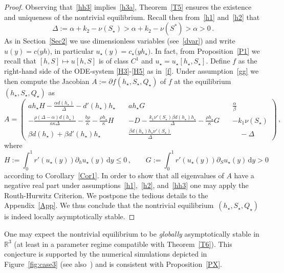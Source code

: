 \documentclass[reqno,11pt]{amsart}
\numberwithin{equation}{section}
\newcommand{\rd}{\mathrm{d}}
\begin{document}
\begin{proof}
Observing that~\eqref{hh3} implies~\eqref{h3a}, Theorem~\ref{T5} ensures the existence and uniqueness of the nontrivial equilibrium.
Recall then from~\eqref{h1} and~\eqref{h2} that
\begin{equation}\label{Delta}
\Delta:=\alpha+k_2-\nu(S_\star)>\alpha+k_2-\nu(S^*)>\alpha>0\,. 
\end{equation}
As in Section~\ref{Sec2} we use dimensionless variables (see~\eqref{dvar}) and write
$u(y)=c\bigl(yh\bigr)$, in particular $u_\star(y)=c_\star\bigl(yh_\star\bigr)$. In fact, from Proposition~\ref{P1} we recall that $[h,S]\mapsto u[h,S]$ is of class $C^1$ and $u_\star=u_\star[h_\star,S_\star]$.
Define $f$ as the right-hand side of the ODE-system \eqref{H3}-\eqref{H5} as in~\eqref{f}.
Under assumption~\eqref{gg} we then compute the Jacobian $A:=\partial f(h_\star,S_\star,Q_\star)$ of $f$  at the equilibrium $(h_\star,S_\star,Q_\star)$ as
\begin{equation}\label{MA}
A=
\left(\begin{matrix}
a   h_\star   H -\frac{\alpha  d(h_\star)}{\Delta}-d'(h_\star)  h_\star\quad  & a   h_\star   G\quad & \frac{\alpha}{\beta}\\[4pt]
-\frac{\rho (\Delta-\alpha)d(h_\star)}{a   \kappa    \Delta}-\frac{b   \rho}{\kappa}-\frac{\rho  h_\star}{\kappa}  H \quad &-D-\frac{k_1   \nu'(S_\star)  \beta  d(h_\star)   h_\star}{\Delta}-\frac{\rho  h_\star}{\kappa}  G\quad  & -k_1   \nu(S_\star)\\[4pt]
\beta  d(h_\star) +\beta  d'(h_\star)  h_\star\quad &\frac{\beta  d(h_\star)   h_\star   \nu'(S_\star)}{\Delta}&\quad -\Delta
\end{matrix}\right)\,,
\end{equation}
where
\begin{equation}\label{GH}
H:=\int_0^1 r'(u_\star(y))\partial_h u_\star(y)\,\rd y\le 0\,,\qquad G:=\int_0^1 r'(u_\star(y))\partial_S u_\star(y)\,\rd y> 0
\end{equation}
according to Corollary~\ref{Cor1}.  In order to show that all eigenvalues of $A$ have a negative real part under assumptions~\eqref{h1},~\eqref{h2}, and~\eqref{hh3} one may apply the Routh-Hurwitz Criterion. We postpone the tedious details to the Appendix~\ref{App}. 
We thus conclude that the nontrivial equilibrium~$(h_\star,S_\star,Q_\star)$ is indeed locally asymptotically  stable. 
\end{proof}

One may expect the nontrivial equilibrium to be \emph{globally} asymptotically stable in $\mathbb{R}^3$ (at least in a parameter regime compatible with Theorem~\ref{T6}). This conjecture is supported by the numerical simulations depicted in Figure~\ref{fig:case3} (see also~\cite{MasicEberl12}) and is consistent with Proposition~\ref{PX}.
\end{document}
